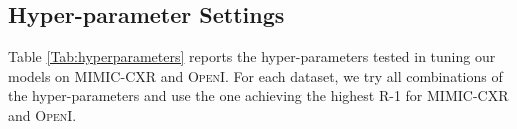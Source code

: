 

\subsection{Hyper-parameter Settings}
\label{appendix:hyperparameter}

Table \ref{Tab:hyperparameters} reports the hyper-parameters tested in tuning our models on \textsc{MIMIC-CXR} and \textsc{OpenI}.
For each dataset, we try all combinations of the hyper-parameters and use the one achieving the highest R-1 for \textsc{MIMIC-CXR} and \textsc{OpenI}.


\begin{table}[t]
\footnotesize
\centering
{}
 \linespread{1}
  \caption{The hyper-parameters that we have experimented on the datasets. The bold values illustrates the best configurations of different models.}%
  \label{Tab:hyperparameters}
\end{table}

